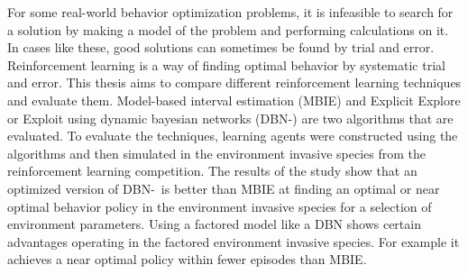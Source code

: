 For some real-world behavior optimization problems, it is infeasible to search for a solution by making a model of the problem and performing calculations on it. 
In cases like these, good solutions can sometimes be found by trial and error. 
Reinforcement learning is a way of finding optimal behavior by systematic trial and error.
This thesis aims to compare different reinforcement learning techniques and evaluate them. 
Model-based interval estimation (MBIE) and Explicit Explore or Exploit using dynamic bayesian networks (DBN-\etre)
 are two algorithms that are evaluated. 
To evaluate the techniques, learning agents were constructed using the algorithms and 
then simulated in the environment invasive species from the reinforcement learning competition.
The results of the study show that an optimized version of DBN-\etre\ is better than MBIE at finding an optimal or near optimal behavior policy in the 
environment invasive species for a selection of environment parameters.
Using a factored model like a DBN shows certain advantages operating in 
the factored environment invasive species. For example it achieves a near optimal
policy within fewer episodes than MBIE.






